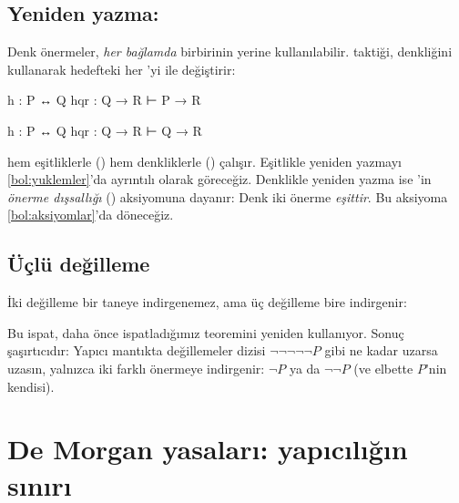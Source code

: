 \subsection{Yeniden yazma: \texorpdfstring{}{rw}}

Denk önermeler, \emph{her bağlamda} birbirinin yerine kullanılabilir.
 taktiği,  denkliğini kullanarak hedefteki
her 'yi  ile değiştirir:


\begin{hedefgecisi}
\begin{hedefdurumu}
h : P ↔ Q
hqr : Q → R
⊢ P → R
\end{hedefdurumu}
\sonra
\begin{hedefdurumu}
h : P ↔ Q
hqr : Q → R
⊢ Q → R
\end{hedefdurumu}
\end{hedefgecisi}

\noindent {} hem eşitliklerle () hem denkliklerle
() çalışır. Eşitlikle yeniden yazmayı \cref{bol:yuklemler}'da
ayrıntılı olarak göreceğiz. Denklikle yeniden yazma ise \Lean{}'in
\emph{önerme dışsallığı} () aksiyomuna dayanır: Denk iki önerme
\emph{eşittir}. Bu aksiyoma \cref{bol:aksiyomlar}'da döneceğiz.

\subsection{Üçlü değilleme}

İki değilleme bir taneye indirgenemez, ama üç değilleme bire indirgenir:


\noindent Bu ispat, daha önce ispatladığımız 
teoremini yeniden kullanıyor. Sonuç şaşırtıcıdır: Yapıcı mantıkta
değillemeler dizisi $\neg\neg\neg\neg\neg P$ gibi ne kadar uzarsa uzasın,
yalnızca iki farklı önermeye indirgenir: $\neg P$ ya da $\neg\neg P$
(ve elbette $P$'nin kendisi).

\section{De Morgan yasaları: yapıcılığın sınırı}\label{sec:demorgan}

